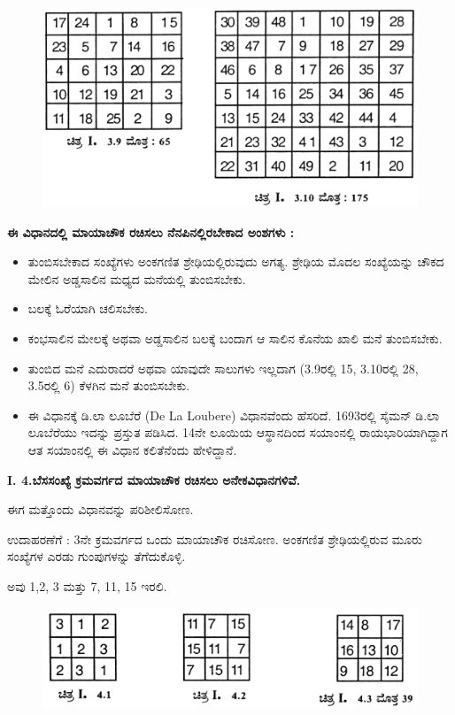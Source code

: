\begin{itemize}
\begin{figure}[H]
	\includegraphics{src/figures/chap3/fig3-8.jpg}
	\end{figure}
\end{itemize}

\noindent \textbf{ಈ ವಿಧಾನದಲ್ಲಿ ಮಾಯಾಚೌಕ ರಚಿಸಲು ನೆನಪಿನಲ್ಲಿರಬೇಕಾದ ಅಂಶಗಳು :}
\begin{itemize}
	\item ತುಂಬಿಸಬೇಕಾದ ಸಂಖ್ಯೆಗಳು ಅಂಕಗಣಿತ ಶ್ರೇಢಿಯಲ್ಲಿರುವುದು ಅಗತ್ಯ. ಶ್ರೇಢಿಯ ಮೊದಲ ಸಂಖ್ಯೆಯನ್ನು ಚೌಕದ ಮೇಲಿನ ಅಡ್ಡಸಾಲಿನ ಮಧ್ಯದ ಮನೆಯಲ್ಲಿ ತುಂಬಿಸಬೇಕು.
	\item ಬಲಕ್ಕೆ ಓರೆಯಾಗಿ ಚಲಿಸಬೇಕು.
	\item ಕಂಭಸಾಲಿನ ಮೇಲಕ್ಕೆ ಅಥವಾ ಅಡ್ಡಸಾಲಿನ ಬಲಕ್ಕೆ ಬಂದಾಗ ಆ ಸಾಲಿನ ಕೊನೆಯ ಖಾಲಿ ಮನೆ ತುಂಬಿಸಬೇಕು.
	\item ತುಂಬಿದ ಮನೆ ಎದುರಾದರೆ ಅಥವಾ ಯಾವುದೇ ಸಾಲುಗಳು ಇಲ್ಲದಾಗ (3.9ರಲ್ಲಿ 15, 3.10ರಲ್ಲಿ 28, 3.5ರಲ್ಲಿ 6) ಕೆಳಗಿನ ಮನೆ ತುಂಬಿಸಬೇಕು.
	\item ಈ ವಿಧಾನಕ್ಕೆ ಡಿ.ಲಾ ಲೂಬೆರೆ (De La Loubere) ವಿಧಾನವೆಂದು ಹೆಸರಿದೆ. 1693ರಲ್ಲಿ ಸೈಮನ್ ಡಿ.ಲಾ ಲೂಬೆರೆಯು ಇದನ್ನು ಪ್ರಸ್ತುತ ಪಡಿಸಿದ. 14ನೇ \break ಲೂಯಿಯ ಆಸ್ಥಾನದಿಂದ ಸಯಾಂನಲ್ಲಿ ರಾಯಭಾರಿಯಾಗಿದ್ದಾಗ ಆತ ಸಯಾಂನಲ್ಲಿ ಈ ವಿಧಾನ ಕಲಿತೆನೆಂದು ಹೇಳಿದ್ದಾನೆ.
\end{itemize}

\noindent \textbf{I. 4.ಬೆಸಸಂಖ್ಯೆ ಕ್ರಮವರ್ಗದ ಮಾಯಾಚೌಕ ರಚಿಸಲು ಅನೇಕವಿಧಾನಗಳಿವೆ.}

ಈಗ ಮತ್ತೊಂದು ವಿಧಾನವನ್ನು ಪರಿಶೀಲಿಸೋಣ.

ಉದಾಹರಣೆಗೆ : 3ನೇ ಕ್ರಮವರ್ಗದ ಒಂದು ಮಾಯಾಚೌಕ ರಚಿಸೋಣ. ಅಂಕಗಣಿತ ಶ್ರೇಢಿಯಲ್ಲಿರುವ ಮೂರು ಸಂಖ್ಯೆಗಳ ಎರಡು ಗುಂಪುಗಳನ್ನು ತೆಗೆದುಕೊಳ್ಳಿ.

ಅವು 1,2, 3 ಮತ್ತು 7, 11, 15 ಇರಲಿ.
\begin{figure}[H]
\includegraphics{src/figures/chap3/fig3-9.jpg}
\end{figure}


